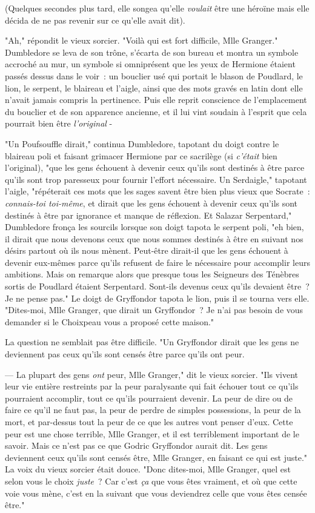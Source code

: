 (Quelques secondes plus tard, elle songea qu'elle \emph{voulait} être une héroïne mais elle décida de ne pas revenir sur ce qu'elle avait dit).

"Ah," répondit le vieux sorcier. "Voilà qui est fort difficile, Mlle Granger." Dumbledore se leva de son trône, s'écarta de son bureau et montra un symbole accroché au mur, un symbole si omniprésent que les yeux de Hermione étaient passés dessus dans le voir~: un bouclier usé qui portait le blason de Poudlard, le lion, le serpent, le blaireau et l'aigle, ainsi que des mots gravés en latin dont elle n'avait jamais compris la pertinence. Puis elle reprit conscience de l'emplacement du bouclier et de son apparence ancienne, et il lui vint soudain à l'esprit que cela pourrait bien être \emph{l'original} -

"Un Poufsouffle dirait," continua Dumbledore, tapotant du doigt contre le blaireau poli et faisant grimacer Hermione par ce sacrilège (si \emph{c'était} bien l'original), "que les gens échouent à devenir ceux qu'ils sont destinés à être parce qu'ils sont trop paresseux pour fournir l'effort nécessaire. Un Serdaigle," tapotant l'aigle, "répéterait ces mots que les sages savent être bien plus vieux que Socrate~: \emph{connais-toi toi-même}, et dirait que les gens échouent à devenir ceux qu'ils sont destinés à être par ignorance et manque de réflexion. Et Salazar Serpentard," Dumbledore fronça les sourcils lorsque son doigt tapota le serpent poli, "eh bien, il dirait que nous devenons ceux que nous sommes destinés à être en suivant nos désirs partout où ils nous mènent. Peut-être dirait-il que les gens échouent à devenir eux-mêmes parce qu'ils refusent de faire le nécessaire pour accomplir leurs ambitions. Mais on remarque alors que presque tous les Seigneurs des Ténèbres sortis de Poudlard étaient Serpentard. Sont-ils devenus ceux qu'ils devaient être~? Je ne pense pas." Le doigt de Gryffondor tapota le lion, puis il se tourna vers elle. "Dites-moi, Mlle Granger, que dirait un Gryffondor~? Je n'ai pas besoin de vous demander si le Choixpeau vous a proposé cette maison."

La question ne semblait pas être difficile. "Un Gryffondor dirait que les gens ne deviennent pas ceux qu'ils sont censés être parce qu'ils ont peur.

--- La plupart des gens \emph{ont} peur, Mlle Granger," dit le vieux sorcier. "Ils vivent leur vie entière restreints par la peur paralysante qui fait échouer tout ce qu'ils pourraient accomplir, tout ce qu'ils pourraient devenir. La peur de dire ou de faire ce qu'il ne faut pas, la peur de perdre de simples possessions, la peur de la mort, et par-dessus tout la peur de ce que les autres vont penser d'eux. Cette peur est une chose terrible, Mlle Granger, et il est terriblement important de le savoir. Mais ce n'est pas ce que Godric Gryffondor aurait dit. Les gens deviennent ceux qu'ils sont censés être, Mlle Granger, en faisant ce qui est juste." La voix du vieux sorcier était douce. "Donc dites-moi, Mlle Granger, quel est selon vous le choix \emph{juste}~? Car c'est \emph{ça} que vous êtes vraiment, et où que cette voie vous mène, c'est en la suivant que vous deviendrez celle que vous êtes censée être."

